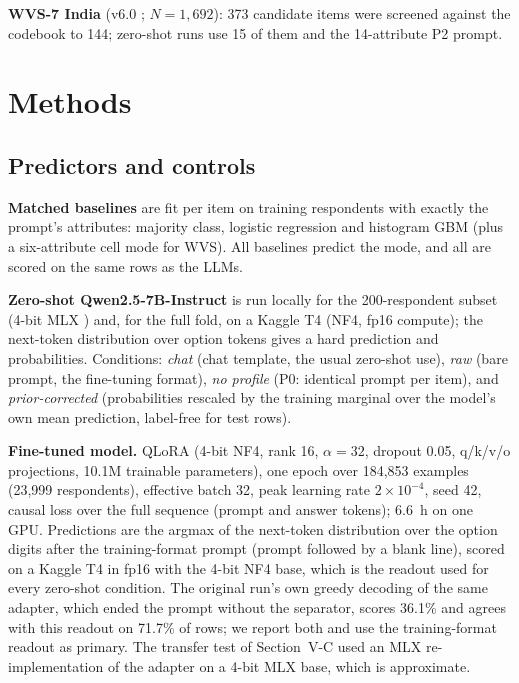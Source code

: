 \documentclass[conference]{IEEEtran}
\begin{document}
\textbf{WVS-7 India} (v6.0 \cite{wvs7}; $N=1{,}692$): 373 candidate items were screened against the codebook to 144; zero-shot runs use 15 of them and the 14-attribute P2 prompt.

\section{Methods}

\subsection{Predictors and controls}

\textbf{Matched baselines} are fit per item on training respondents with exactly the prompt's attributes: majority class, logistic regression and histogram GBM \cite{pedregosa2011} (plus a six-attribute cell mode for WVS). All baselines predict the mode, and all are scored on the same rows as the LLMs.

\textbf{Zero-shot Qwen2.5-7B-Instruct} \cite{qwen2025} is run locally for the 200-respondent subset (4-bit MLX \cite{mlx2023}) and, for the full fold, on a Kaggle T4 (NF4, fp16 compute); the next-token distribution over option tokens gives a hard prediction and probabilities. Conditions: \emph{chat} (chat template, the usual zero-shot use), \emph{raw} (bare prompt, the fine-tuning format), \emph{no profile} (P0: identical prompt per item), and \emph{prior-corrected} (probabilities rescaled by the training marginal over the model's own mean prediction, label-free for test rows).

\textbf{Fine-tuned model.} QLoRA \cite{dettmers2023,hu2022} (4-bit NF4, rank 16, $\alpha{=}32$, dropout 0.05, q/k/v/o projections, 10.1M trainable parameters), one epoch over 184{,}853 examples (23{,}999 respondents), effective batch 32, peak learning rate $2\times10^{-4}$, seed 42, causal loss over the full sequence (prompt and answer tokens); 6.6~h on one GPU. Predictions are the argmax of the next-token distribution over the option digits after the training-format prompt (prompt followed by a blank line), scored on a Kaggle T4 in fp16 with the 4-bit NF4 base, which is the readout used for every zero-shot condition. The original run's own greedy decoding of the same adapter, which ended the prompt without the separator, scores 36.1\% and agrees with this readout on 71.7\% of rows; we report both and use the training-format readout as primary. The transfer test of Section~V-C used an MLX re-implementation of the adapter on a 4-bit MLX base, which is approximate.
\end{document}
